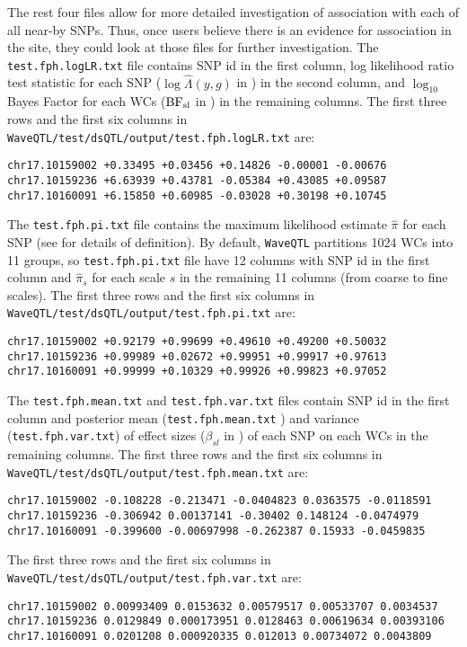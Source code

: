 \documentclass[11pt]{article}
\def\logten{\log_{10}}
\def\BF{\rm BF}
\begin{document}
The rest four files allow for more detailed investigation of association with each of all near-by SNPs. Thus, once users believe there is an evidence for association in the site, they could look at those files for further investigation. The {\tt test.fph.logLR.txt} file contains SNP id in the first column, log likelihood ratio test statistic for each SNP ($\log\hat\Lambda(y, g)$ in \cite{Shim2014}) in the second column, and $\logten$ Bayes Factor for each WCs ($\BF_{sl}$ in \cite{Shim2014}) in the remaining columns. 
The first three rows and the first six columns in {\tt WaveQTL/test/dsQTL/output/test.fph.logLR.txt} are:
\begin{verbatim}
chr17.10159002 +0.33495 +0.03456 +0.14826 -0.00001 -0.00676
chr17.10159236 +6.63939 +0.43781 -0.05384 +0.43085 +0.09587
chr17.10160091 +6.15850 +0.60985 -0.03028 +0.30198 +0.10745
\end{verbatim}

The {\tt test.fph.pi.txt} file contains the maximum likelihood estimate $\hat\pi$ for each SNP (see \cite{Shim2014} for details of definition). By default, {\tt WaveQTL} partitions 1024 WCs into 11 groups, so {\tt test.fph.pi.txt} file have 12 columns with SNP id in the first column and $\hat \pi_s$ for each scale $s$ in the remaining 11 columns (from coarse to fine scales). The first three rows and the first six columns in \\{\tt WaveQTL/test/dsQTL/output/test.fph.pi.txt} are:
\begin{verbatim} 
chr17.10159002 +0.92179 +0.99699 +0.49610 +0.49200 +0.50032 
chr17.10159236 +0.99989 +0.02672 +0.99951 +0.99917 +0.97613 
chr17.10160091 +0.99999 +0.10329 +0.99926 +0.99823 +0.97052 
\end{verbatim}
 
 The {\tt test.fph.mean.txt} and {\tt test.fph.var.txt} files contain SNP id in the first column and posterior mean ({\tt test.fph.mean.txt} ) and variance ({\tt test.fph.var.txt}) of effect sizes ($\beta_{sl}$ in \cite{Shim2014}) of each SNP on each WCs in the remaining columns. 
The first three rows and the first six columns in {\tt WaveQTL/test/dsQTL/output/test.fph.mean.txt} are:
\begin{verbatim} 
chr17.10159002 -0.108228 -0.213471 -0.0404823 0.0363575 -0.0118591 
chr17.10159236 -0.306942 0.00137141 -0.30402 0.148124 -0.0474979   
chr17.10160091 -0.399600 -0.00697998 -0.262387 0.15933 -0.0459835 
\end{verbatim} 
The first three rows and the first six columns in {\tt WaveQTL/test/dsQTL/output/test.fph.var.txt} are:
\begin{verbatim} 
chr17.10159002 0.00993409 0.0153632 0.00579517 0.00533707 0.0034537
chr17.10159236 0.0129849 0.000173951 0.0128463 0.00619634 0.00393106
chr17.10160091 0.0201208 0.000920335 0.012013 0.00734072 0.0043809
\end{verbatim} 
\end{document}
